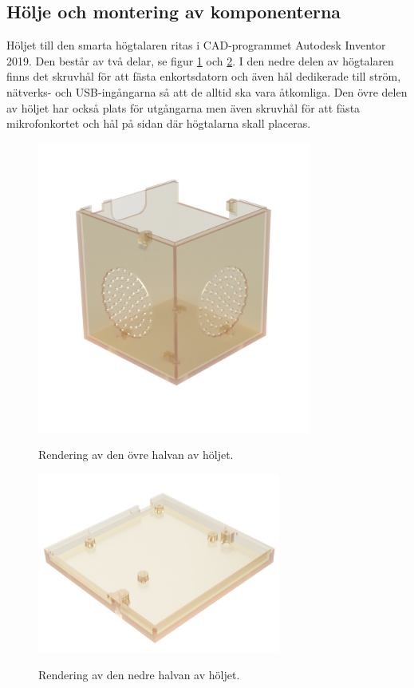 \subsection{Hölje och montering av komponenterna}
Höljet till den smarta högtalaren ritas i CAD-programmet Autodesk Inventor 2019. Den består av två delar, se figur \ref{fig:top-3d} och \ref{fig:bottom-3d}. I den nedre delen av högtalaren finns det skruvhål för att fästa enkortsdatorn och även hål dedikerade till ström, nätverks- och USB-ingångarna så att de alltid ska vara åtkomliga. Den övre delen av höljet har också plats för utgångarna men även skruvhål för att fästa mikrofonkortet och hål på sidan där högtalarna skall placeras. 
\begin{figure}[H]
    \centering
    \caption{\small Rendering av den övre halvan av höljet.}
    \includegraphics[width=9cm]{bilder/top_transparent.png}
    \label{fig:top-3d}
\end{figure}
\begin{figure}[H]
    \centering
    \caption{\small Rendering av den nedre halvan av höljet.}
    \includegraphics[width=8cm]{bilder/bottom_transparent.png}
    \label{fig:bottom-3d} 
\end{figure}

